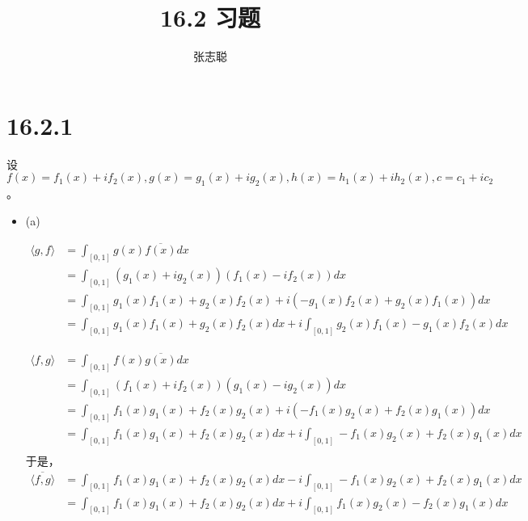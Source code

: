 \documentclass{article}
\begin{document}
\title{16.2 习题}
\author{张志聪}
\maketitle

\section*{16.2.1}

设$f(x) = f_1(x) + if_2(x), g(x) = g_1(x) + ig_2(x), h(x) = h_1(x) + ih_2(x), c = c_1 + ic_2$。

\begin{itemize}
  \item (a)

        \begin{align*}
          \langle g, f \rangle & = \int_{[0, 1]} g(x) \overline{f(x)} dx                                                         \\
                               & = \int_{[0, 1]} \left(g_1(x) + ig_2(x)\right) \left(f_1(x) - if_2(x)\right) dx                  \\
                               & = \int_{[0, 1]} g_1(x) f_1(x) + g_2(x)f_2(x) + i(-g_1(x)f_2(x) + g_2(x)f_1(x)) dx               \\
                               & = \int_{[0, 1]} g_1(x) f_1(x) + g_2(x)f_2(x) dx + i\int_{[0, 1]} g_2(x)f_1(x) - g_1(x)f_2(x) dx
        \end{align*}

        \begin{align*}
          \langle f, g \rangle & = \int_{[0, 1]} f(x) \overline{g(x)} dx                                                        \\
                               & = \int_{[0, 1]} (f_1(x) + if_2(x)) (g_1(x) - ig_2(x)) dx                                       \\
                               & = \int_{[0, 1]} f_1(x)g_1(x) + f_2(x)g_2(x) + i(-f_1(x)g_2(x) + f_2(x)g_1(x)) dx               \\
                               & = \int_{[0, 1]} f_1(x)g_1(x) + f_2(x)g_2(x) dx + i\int_{[0, 1]}-f_1(x)g_2(x) + f_2(x)g_1(x) dx \\
        \end{align*}
        于是，
        \begin{align*}
          \overline{\langle f, g \rangle} & = \int_{[0, 1]} f_1(x)g_1(x) + f_2(x)g_2(x) dx - i\int_{[0, 1]}-f_1(x)g_2(x) + f_2(x)g_1(x) dx \\
                                          & = \int_{[0, 1]} f_1(x)g_1(x) + f_2(x)g_2(x) dx + i\int_{[0, 1]}f_1(x)g_2(x) - f_2(x)g_1(x) dx  \\
        \end{align*}


\end{itemize}
\end{document}
